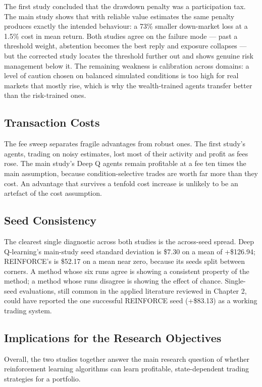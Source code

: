 The first study concluded that the drawdown penalty was a participation tax.
The main study shows that with reliable value estimates the same penalty
produces exactly the intended behaviour: a 73\% smaller down-market loss
at a 1.5\% cost in mean return. Both studies agree on the failure mode
--- past a threshold weight, abstention becomes the best reply and
exposure collapses --- but the corrected study locates the threshold
further out and shows genuine risk management below it. The remaining
weakness is calibration across domains: a level of caution chosen on
balanced simulated conditions is too high for real markets that mostly
rise, which is why the wealth-trained agents transfer better than the
risk-trained ones.

\subsection{Transaction Costs}

The fee sweep separates fragile advantages from robust ones. The first
study's agents, trading on noisy estimates, lost most of their activity
and profit as fees rose. The main study's Deep Q agents remain
profitable at a fee ten times the main assumption, because
condition-selective trades are worth far more than they cost. An
advantage that survives a tenfold cost increase is unlikely to be an
artefact of the cost assumption.

\subsection{Seed Consistency}

The clearest single diagnostic across both studies is the across-seed
spread. Deep Q-learning's main-study seed standard deviation is \$7.30
on a mean of +\$126.94; REINFORCE's is \$52.17 on a mean near zero,
because its seeds split between corners. A method whose six runs agree
is showing a consistent property of the method; a method whose runs
disagree is showing the effect of chance. Single-seed evaluations, still common in the
applied literature reviewed in Chapter 2, could have reported the one
successful REINFORCE seed (+\$83.13) as a working trading system.

\subsection{Implications for the Research Objectives}

Overall, the two studies together answer the main research question of
whether reinforcement learning algorithms can learn profitable,
state-dependent trading strategies for a portfolio.

